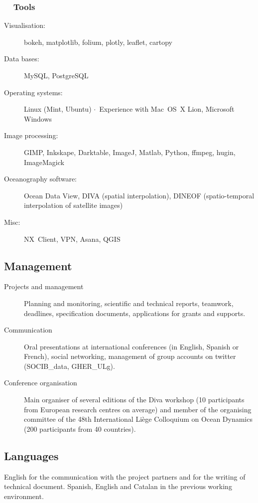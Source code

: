 \documentclass[11pt,a4paper,svgnames]{article}
\newcommand*\circled[1]{\tikz[baseline=(char.base)]{\node[shape=circle,draw,inner sep=2pt] (char) {#1};}}
\newcommand{\sepa}{$\cdot$~}
\begin{document}
\subsubsection*{\circled{\faWrench}~~Tools}

\begin{description}
\item[Visualisation:] bokeh, matplotlib, folium, plotly, leaflet, cartopy
\item[Data bases:] MySQL, PostgreSQL
\item[Operating systems:] Linux (Mint, Ubuntu) \sepa Experience with Mac~OS~X Lion, Microsoft Windows
\item[Image processing:] GIMP, Inkskape, Darktable, ImageJ, Matlab, Python, ffmpeg, hugin, ImageMagick
\item[Oceanography software:] Ocean Data View, DIVA (spatial interpolation), DINEOF (spatio-temporal interpolation of satellite images)
\item[Misc:] NX~Client, VPN, Asana, QGIS
\end{description}


\subsection{Management}

\begin{description}
\item[Projects and management] {Planning and monitoring, scientific and technical reports, teamwork, deadlines, specification documents, applications for grants and supports.}

\item[Communication] {Oral presentations at international conferences (in English, Spanish or French), social networking, management of group accounts on twitter (SOCIB\_data, GHER\_ULg).}

\item[Conference organisation]{Main organiser of several editions of the Diva workshop (10 participants from European research centres on average) and member of the organising committee of the 48th International Li\`{e}ge Colloquium on Ocean Dynamics (200 participants from 40 countries).}

\end{description}


\subsection{Languages}
\begin{summarybox}
English for the communication with the project partners and for the writing of technical document. Spanish, English and Catalan in the previous working environment.
\end{summarybox}
\end{document}
